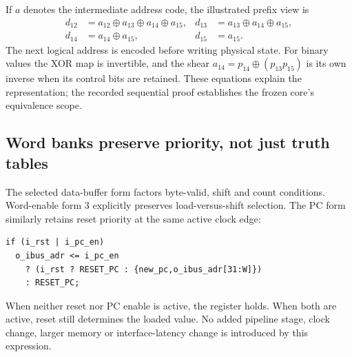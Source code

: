 \begin{center}\end{center}
If $a$ denotes the intermediate address code, the illustrated prefix view is
\[
\begin{aligned}
d_{12}&=a_{12}\oplus a_{13}\oplus a_{14}\oplus a_{15},&d_{13}&=a_{13}\oplus a_{14}\oplus a_{15},\\
d_{14}&=a_{14}\oplus a_{15},&d_{15}&=a_{15}.
\end{aligned}
\]
The next logical address is encoded before writing physical state. For binary values the XOR map is invertible, and the shear $a_{14}=p_{14}\oplus(p_{13}p_{15})$ is its own inverse when its control bits are retained. These equations explain the representation; the recorded sequential proof establishes the frozen core's equivalence scope.

\subsection{Word banks preserve priority, not just truth tables}
The selected data-buffer form factors byte-valid, shift and count conditions. Word-enable form 3 explicitly preserves load-versus-shift selection. The PC form similarly retains reset priority at the same active clock edge:
\begin{lstlisting}[language=VerilogDiff,basicstyle=\ttfamily\scriptsize]
if (i_rst | i_pc_en)
  o_ibus_adr <= i_pc_en
    ? (i_rst ? RESET_PC : {new_pc,o_ibus_adr[31:W]})
    : RESET_PC;
\end{lstlisting}
When neither reset nor PC enable is active, the register holds. When both are active, reset still determines the loaded value. No added pipeline stage, clock change, larger memory or interface-latency change is introduced by this expression.

